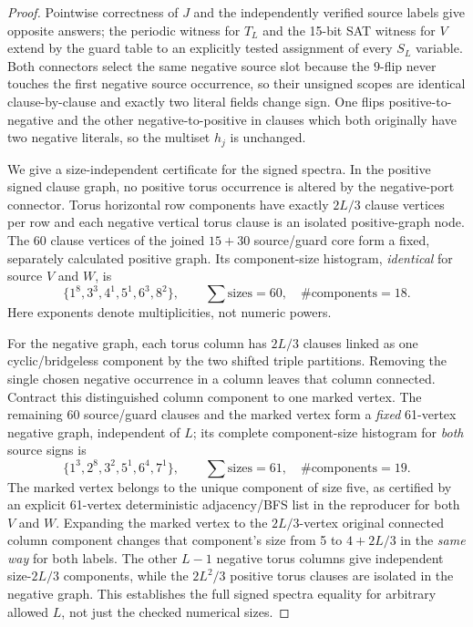 \documentclass[10pt]{article}
\begin{document}
\begin{proof}
Pointwise correctness of $J$ and the independently verified source labels give opposite answers; the periodic witness for $T_L$ and the 15-bit SAT witness for $V$ extend by the guard table to an explicitly tested assignment of every $S_L$ variable. Both connectors select the same negative source slot because the $9$-flip never touches the first negative source occurrence, so their unsigned scopes are identical clause-by-clause and exactly two literal fields change sign. One flips positive-to-negative and the other negative-to-positive in clauses which both originally have two negative literals, so the multiset $h_j$ is unchanged.

We give a size-independent certificate for the signed spectra. In the positive signed clause graph, no positive torus occurrence is altered by the negative-port connector. Torus horizontal row components have exactly $2L/3$ clause vertices per row and each negative vertical torus clause is an isolated positive-graph node. The 60 clause vertices of the joined $15+30$ source/guard core form a fixed, separately calculated positive graph. Its component-size histogram, \emph{identical} for source $V$ and $W$, is
\[
\{1^{8},3^{3},4^{1},5^{1},6^{3},8^{2}\},\qquad \sum\text{sizes}=60,\quad \#\text{components}=18.
\]
Here exponents denote multiplicities, not numeric powers.

For the negative graph, each torus column has $2L/3$ clauses linked as one cyclic/bridgeless component by the two shifted triple partitions. Removing the single chosen negative occurrence in a column leaves that column connected. Contract this distinguished column component to one marked vertex. The remaining 60 source/guard clauses and the marked vertex form a \emph{fixed} 61-vertex negative graph, independent of $L$; its complete component-size histogram for \emph{both} source signs is
\[
\{1^{3},2^{8},3^{2},5^{1},6^{4},7^{1}\},\qquad \sum\text{sizes}=61,\quad \#\text{components}=19.
\]
The marked vertex belongs to the unique component of size five, as certified by an explicit 61-vertex deterministic adjacency/BFS list in the reproducer for both $V$ and $W$. Expanding the marked vertex to the $2L/3$-vertex original connected column component changes that component's size from 5 to $4+2L/3$ in the \emph{same way} for both labels. The other $L-1$ negative torus columns give independent size-$2L/3$ components, while the $2L^2/3$ positive torus clauses are isolated in the negative graph. This establishes the full signed spectra equality for arbitrary allowed $L$, not just the checked numerical sizes.


\end{proof}
\end{document}

